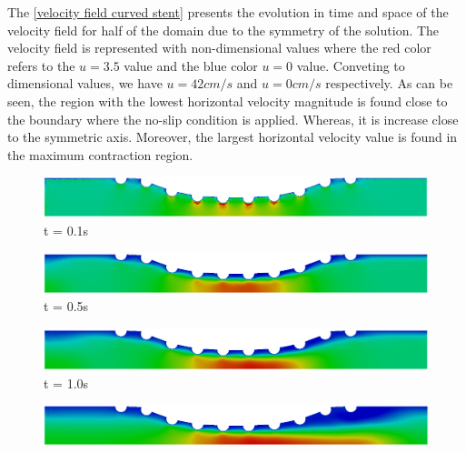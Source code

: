 \newpage
The \ref{velocity field curved stent} presents the evolution in 
time and space of the velocity field for half of the domain
due to the symmetry of the solution. 
The velocity field is represented with non-dimensional values 
where the red color refers to the $u=3.5$ value and the blue color 
$u=0$ value. Conveting to dimensional values, 
we have $u=42cm/s$ and $u=0cm/s$ respectively.
As can be seen, the region with the lowest horizontal velocity 
magnitude is found close to the boundary where the no-slip
condition is applied. Whereas, it is increase close to 
the symmetric axis. Moreover, the largest horizontal velocity value
is found in the maximum contraction region.


\vspace{2cm} 
\begin{figure}[H]
     \begin{minipage}{.50\linewidth}
      \centering
      \includegraphics[scale=0.18]{./02_chaps/cap_solution/figure/vel_CurvedStrut1.png}\\
      t = 0.1s
     \end{minipage}%
     \begin{minipage}{.50\linewidth}
      \centering
      \includegraphics[scale=0.18]{./02_chaps/cap_solution/figure/vel_CurvedStrut2.png}\\
      t = 0.5s
     \end{minipage}
     \begin{minipage}{.50\linewidth}
     \medskip
      \centering
      \includegraphics[scale=0.18]{./02_chaps/cap_solution/figure/vel_CurvedStrut3.png}\\
      t = 1.0s
     \end{minipage}%
     \begin{minipage}{.50\linewidth}
     \medskip
      \centering
      \includegraphics[scale=0.18]{./02_chaps/cap_solution/figure/vel_CurvedStrut4.png}\\

\end{minipage}
\end{figure}
